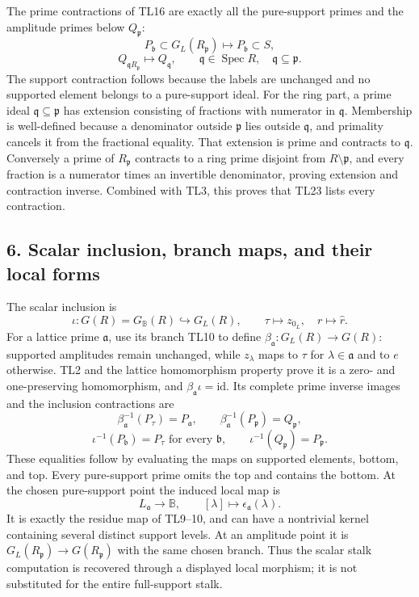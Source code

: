 \documentclass[11pt,a4paper]{article}
\theoremstyle{definition}\newtheorem{definition}[theorem]{Definition}
\begin{document}
The prime contractions of TL16 are exactly all the pure-support primes
and the amplitude primes below \(Q_{\mathfrak p}\): \[
 P_{\mathfrak b}\subset G_L(R_{\mathfrak p})\longmapsto P_{\mathfrak b}\subset S,
\] \[
 Q_{\mathfrak qR_{\mathfrak p}}\longmapsto Q_{\mathfrak q},
 \qquad\mathfrak q\in\operatorname{Spec}R,\quad\mathfrak q\subseteq\mathfrak p.
 \tag{TL23}
\] The support contraction follows because the labels are unchanged and
no supported element belongs to a pure-support ideal. For the ring part,
a prime ideal \(\mathfrak q\subseteq\mathfrak p\) has extension
consisting of fractions with numerator in \(\mathfrak q\). Membership is
well-defined because a denominator outside \(\mathfrak p\) lies outside
\(\mathfrak q\), and primality cancels it from the fractional equality.
That extension is prime and contracts to \(\mathfrak q\). Conversely a
prime of \(R_{\mathfrak p}\) contracts to a ring prime disjoint from
\(R\setminus\mathfrak p\), and every fraction is a numerator times an
invertible denominator, proving extension and contraction inverse.
Combined with TL3, this proves that TL23 lists every contraction.

\subsection{6. Scalar inclusion, branch maps, and their local
forms}\label{scalar-inclusion-branch-maps-and-their-local-forms}

The scalar inclusion is \[
 \iota:G(R)=G_{\mathbb B}(R)\hookrightarrow G_L(R),\qquad
 \tau\mapsto z_{0_L},\quad r\mapsto\widehat r.
 \tag{TL24}
\] For a lattice prime \(\mathfrak a\), use its branch TL10 to define
\(\beta_{\mathfrak a}:G_L(R)\to G(R)\): supported amplitudes remain
unchanged, while \(z_\lambda\) maps to \(\tau\) for
\(\lambda\in\mathfrak a\) and to \(e\) otherwise. TL2 and the lattice
homomorphism property prove it is a zero- and one-preserving
homomorphism, and \(\beta_{\mathfrak a}\iota=\mathrm{id}\). Its complete
prime inverse images and the inclusion contractions are \[
 \beta_{\mathfrak a}^{-1}(P_\tau)=P_{\mathfrak a},\qquad
 \beta_{\mathfrak a}^{-1}(P_{\mathfrak p})=Q_{\mathfrak p},
\] \[
 \iota^{-1}(P_{\mathfrak b})=P_\tau\text{ for every }\mathfrak b,
 \qquad\iota^{-1}(Q_{\mathfrak p})=P_{\mathfrak p}.
 \tag{TL25}
\] These equalities follow by evaluating the maps on supported elements,
bottom, and top. Every pure-support prime omits the top and contains the
bottom. At the chosen pure-support point the induced local map is \[
 L_{\mathfrak a}\longrightarrow\mathbb B,
 \qquad[\lambda]\mapsto\epsilon_{\mathfrak a}(\lambda).
 \tag{TL26}
\] It is exactly the residue map of TL9--10, and can have a nontrivial
kernel containing several distinct support levels. At an amplitude point
it is \(G_L(R_{\mathfrak p})\to G(R_{\mathfrak p})\) with the same
chosen branch. Thus the scalar stalk computation is recovered through a
displayed local morphism; it is not substituted for the entire
full-support stalk.
\end{document}
